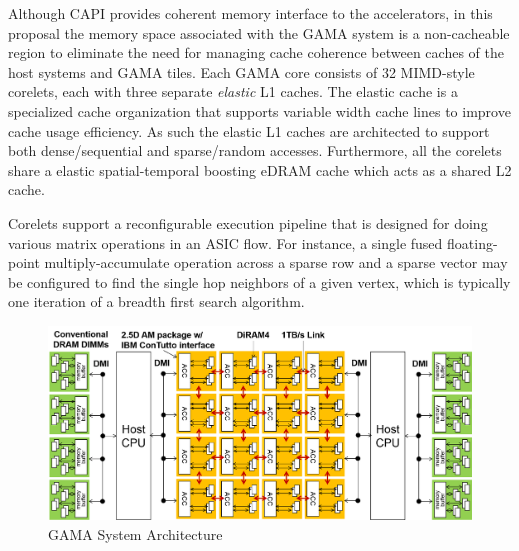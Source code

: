 Although CAPI provides coherent memory interface to the accelerators, in this proposal the memory space associated with the GAMA system is a non-cacheable region to eliminate the need for managing cache coherence between caches of the host systems and GAMA tiles. 
Each GAMA core consists of 32 MIMD-style corelets, each with three separate \emph{elastic} L1 caches. 
The elastic cache is a specialized cache organization that supports variable width cache lines to improve cache usage efficiency.  
As such the elastic L1 caches are architected to support both dense/sequential and sparse/random accesses.
Furthermore, all the corelets share a elastic spatial-temporal boosting eDRAM cache which acts as a shared L2 cache. 

Corelets support a reconfigurable execution pipeline that is designed for doing various matrix operations in an ASIC flow. 
For instance, a single fused floating-point multiply-accumulate operation across a sparse row and a sparse vector may be configured to find the single hop neighbors of a given vertex, which is typically one iteration of a breadth first search algorithm. 

\begin{figure}
\center
\includegraphics[width=1.0\linewidth]{fig/arch.png}
\caption{GAMA System Architecture}
\label{fig:arch}
\end{figure}
 


